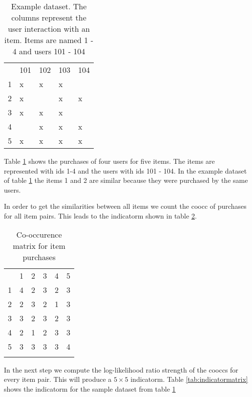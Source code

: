 \begin{table}
\begin{center}
\begin{tabular}{rllll}
 & 101 & 102 & 103 & 104\\
1 & x & x & x &  \\
2 & x &   & x & x\\
3 & x & x & x &  \\
4 &   & x & x & x\\
5 & x & x & x & x\\
\end{tabular}
\end{center}
\caption{Example dataset. The columns represent the user interaction with an item. Items are named 1 - 4 and users 101 - 104}
\label{tbl:llr}
\end{table}

Table \ref{tbl:llr} shows the purchases of four users for five items. The items are represented with ids 1-4 and the users with ids 101 - 104.
In the example dataset of table \ref{tbl:llr} the items 1 and 2 are similar because they were purchased by the same users. 

In order to get the similarities between all items we count the \gls{coocc} of purchases for all item pairs. This leads to the \gls{indicatorm} shown in table \ref{tab:cooccurencematrix}.

\begin{table}
  \centering
\begin{center}
\begin{tabular}{rrrrrr}
  & 1 & 2 & 3 & 4 & 5\\
1 & 4 & 2 & 3 & 2 & 3\\
2 & 2 & 3 & 2 & 1 & 3\\
3 & 3 & 2 & 3 & 2 & 3\\
4 & 2 & 1 & 2 & 3 & 3\\
5 & 3 & 3 & 3 & 3 & 4\\
 &  &  &  &  & \\
\end{tabular}
\end{center}
  \caption{Co-occurence matrix for item purchases}
  \label{tab:cooccurencematrix}
\end{table}

In the next step we compute the log-likelihood ratio strength of the \glspl{coocc} for every item pair. This will produce a $5 \times 5$ \gls{indicatorm}. Table \ref{tab:indicatormatrix} shows the \gls{indicatorm} for the sample dataset from table \ref{tbl:llr}

